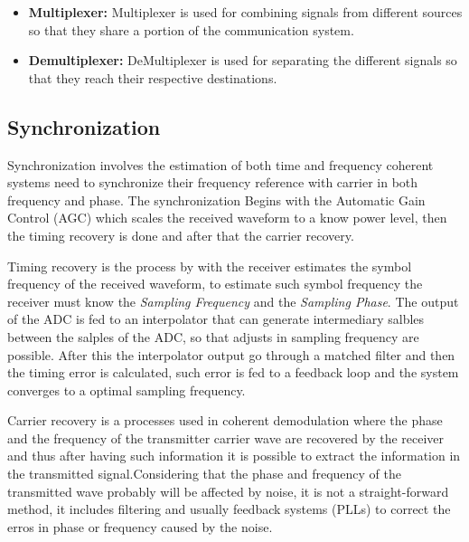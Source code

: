 \begin{itemize}


  \item \textbf{Multiplexer:} Multiplexer is used for combining signals from
different sources so that they share a portion of the communication system.

  \item \textbf{Demultiplexer:} DeMultiplexer is used for separating the different
signals so that they reach their respective destinations.


\end{itemize}

\subsection{Synchronization}

Synchronization involves the estimation of both time and frequency coherent
systems need to synchronize their frequency reference with carrier in both
frequency and phase. The synchronization Begins with the Automatic Gain Control
(AGC) which scales the received waveform to a know power level, then the timing
recovery is done and after that the carrier recovery.

Timing recovery is the process by with the receiver estimates the symbol
frequency of the received waveform, to estimate such symbol frequency the
receiver must know the \textit{Sampling Frequency} and the \textit{Sampling
Phase}. The output of the ADC is fed to an interpolator that can generate
intermediary salbles between the salples of the ADC, so that adjusts in sampling
frequency are possible. After this the interpolator output go through a matched
filter and then the timing error is calculated, such error is fed to a feedback
loop and the system converges to a  optimal sampling frequency.

Carrier recovery is a processes used in coherent demodulation where the phase
and the frequency of the transmitter carrier wave are recovered by the receiver
and thus after having such information it is possible to extract the information
in the transmitted signal.Considering that the phase and frequency of the
transmitted wave probably will be affected by noise, it is not a
straight-forward method, it includes filtering and usually feedback systems
(PLLs) to correct the erros in phase or frequency caused by the noise.

